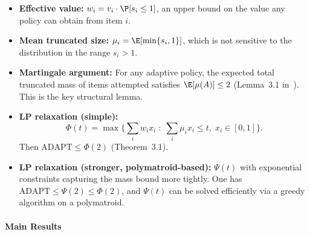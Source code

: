 \begin{itemize}
    \item \textbf{Effective value:} $w_i = v_i \cdot \P[s_i \le 1]$, an upper bound on the value any policy can obtain from item $i$.
    \item \textbf{Mean truncated size:} $\mu_i = \E[\min\{s_i, 1\}]$, which is not sensitive to the distribution in the range $s_i > 1$.
    \item \textbf{Martingale argument:} For any adaptive policy, the expected total truncated mass of items attempted satisfies $\E[\mu(A)] \le 2$ (Lemma~3.1 in~\cite{DeanGoemansVondrak2008}). This is the key structural lemma.
    \item \textbf{LP relaxation (simple):}
    \[
        \Phi(t) = \max\Big\{\sum_i w_i x_i \;:\; \sum_i \mu_i x_i \le t,\; x_i \in [0,1]\Big\}.
    \]
    Then $\mathrm{ADAPT} \le \Phi(2)$ (Theorem~3.1).
    \item \textbf{LP relaxation (stronger, polymatroid-based):} $\Psi(t)$ with exponential constraints capturing the mass bound more tightly. One has $\mathrm{ADAPT} \le \Psi(2) \le \Phi(2)$, and $\Psi(t)$ can be solved efficiently via a greedy algorithm on a polymatroid.
\end{itemize}

\paragraph{Main Results}

